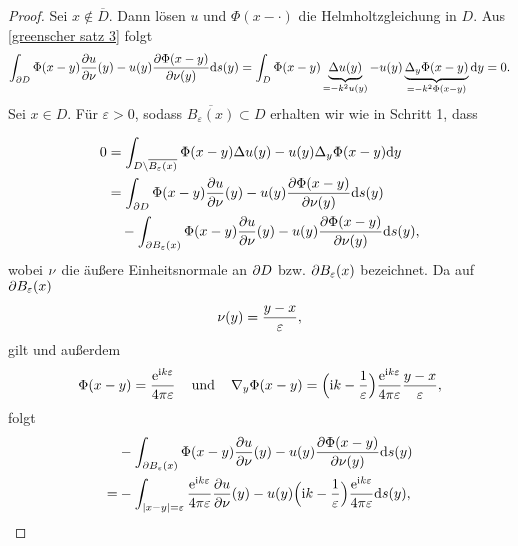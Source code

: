 \begin{proof}
	 Sei \(x\notin\overline{D}\). Dann lösen \(u\) und \(\Phi(x-\cdot)\) die Helmholtzgleichung in \(D\). Aus \eqref{greenscher satz 3} folgt
	\begin{equation*}
		\int_{\partial D}\Phi(x-y)\frac{\partial u}{\partial\nu}(y)-u(y)\frac{\partial\Phi(x-y)}{\partial\nu(y)}\mathrm{d}s(y)=\int_D\Phi(x-y)\underbrace{\Delta u(y)}_{=-k^2u(y)}-u(y)\underbrace{\Delta_y\Phi(x-y)}_{=-k^2\Phi(x-y)}\mathrm{d}y=0.
	\end{equation*}\vspace{1cm}
	 Sei \(x\in D\). Für \(\varepsilon>0\), sodass \(\overline{B_\varepsilon(x)}\subset D\) erhalten wir wie in Schritt 1, dass\vspace{2cm}
	
	
	\begin{equation}
		\label{darstellungssatz im inneren beweis}
		\begin{aligned}
			0&=\int_{D\setminus\overline{B_\varepsilon(x)}}\Phi(x-y)\Delta u(y)-u(y)\Delta_y\Phi(x-y)\mathrm{d}y\\
			&=\int_{\partial D}\Phi(x-y)\frac{\partial u}{\partial\nu}(y)-u(y)\frac{\partial\Phi(x-y)}{\partial\nu(y)}\mathrm{d}s(y)\\
			&\;\;\;\,-\int_{\partial B_\varepsilon(x)}\Phi(x-y)\frac{\partial u}{\partial\nu}(y)-u(y)\frac{\partial\Phi(x-y)}{\partial\nu(y)}\mathrm{d}s(y),
		\end{aligned}
	\end{equation}
	wobei \(\nu\) die äußere Einheitsnormale an \(\partial D\) bzw. \(\partial B_\varepsilon(x)\) bezeichnet. Da auf \(\partial B_\varepsilon(x)\)
	\begin{equation*}
		\nu(y)=\frac{y-x}{\varepsilon},
	\end{equation*}
	gilt und außerdem
	\begin{equation*}
		\Phi(x-y)=\frac{\mathrm{e}^{\mathrm{i} k\varepsilon}}{4\pi\varepsilon}\;\;\;\text{ und }\;\;\;\nabla_y\Phi(x-y)=\Big(\mathrm{i} k-\frac{1}{\varepsilon}\Big)\frac{\mathrm{e}^{\mathrm{i} k\varepsilon}}{4\pi\varepsilon}\frac{y-x}{\varepsilon},
	\end{equation*}
	folgt
	\begin{equation*}
		\begin{aligned}
			&-\int_{\p B_\varepsilon(x)}\Phi(x-y)\frac{\p u}{\p\normal}(y)-u(y)\frac{\p\Phi(x-y)}{\p\normal(y)}\ds(y)\\
			=&-\int_{|x-y|=\varepsilon}\frac{\e^{\ii k\varepsilon}}{4\pi\varepsilon}\frac{\p u}{\p\normal}(y)-u(y)\Big(\ii k-\frac{1}{\varepsilon}\Big)\frac{\e^{\ii k\varepsilon}}{4\pi\varepsilon}\ds(y),
		\end{aligned}

\end{equation*}
\end{proof}
